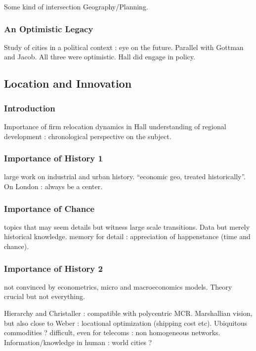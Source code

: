 Some kind of intersection Geography/Planning.

\subsubsection{An Optimistic Legacy}

Study of cities in a political context : eye on the future. Parallel with Gottman and Jacob. All three were optimistic. Hall did engage in policy.


\subsection{Location and Innovation}

\subsubsection{Introduction}

Importance of firm relocation dynamics in Hall understanding of regional development : chronological perspective on the subject.

\subsubsection{Importance of History 1}

large work on industrial and urban history. ``economic geo, treated historically''. On London : always be a center.

\subsubsection{Importance of Chance}

topics that may seem details but witness large scale transitions. Data but merely historical knowledge. memory for detail : appreciation of happenstance (time and chance). 

\subsubsection{Importance of History 2}

not convinced by econometrics, micro and macroeconomics models. Theory crucial but not everything.

Hierarchy and Christaller : compatible with polycentric MCR. Marshallian vision, but also close to Weber : locational optimization (shipping cost etc). Ubiquitous commodities ? difficult, even for telecoms : non homogeneous networks. Information/knowledge in human : world cities ?

